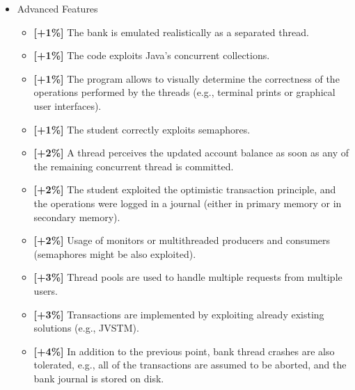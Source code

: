 \documentclass{article}
\begin{document}
\begin{itemize}
\item Advanced Features
\begin{itemize}
	\item  \textbf{[+1\%]} The bank is emulated realistically as a separated thread.
	\item  \textbf{[+1\%]} The code exploits Java's concurrent collections.
	\item \textbf{[+1\%]} The program allows to visually determine the correctness of the operations performed by the threads (e.g., terminal prints or graphical user interfaces).
	\item \textbf{[+1\%]} The student correctly exploits semaphores.
	\item  \textbf{[+2\%]} A thread perceives the updated account balance as soon as any of the remaining concurrent thread is committed.
	\item \textbf{[+2\%]} The student exploited the optimistic transaction principle, and the operations were logged in a journal (either in primary memory or in secondary memory).
	\item \textbf{[+2\%]} Usage of monitors or multithreaded producers and consumers (semaphores might be also exploited).
	\item \textbf{[+3\%]} Thread pools are used to handle multiple requests from multiple users.
	\item \textbf{[+3\%]} Transactions are implemented by exploiting already existing solutions (e.g., JVSTM).
	\item  \textbf{[+4\%]} In addition to the previous point, bank thread crashes are also tolerated, e.g., all of the transactions are assumed to be aborted, and the bank journal is stored on disk. 
\end{itemize}
	\end{itemize}


	
\end{document}
